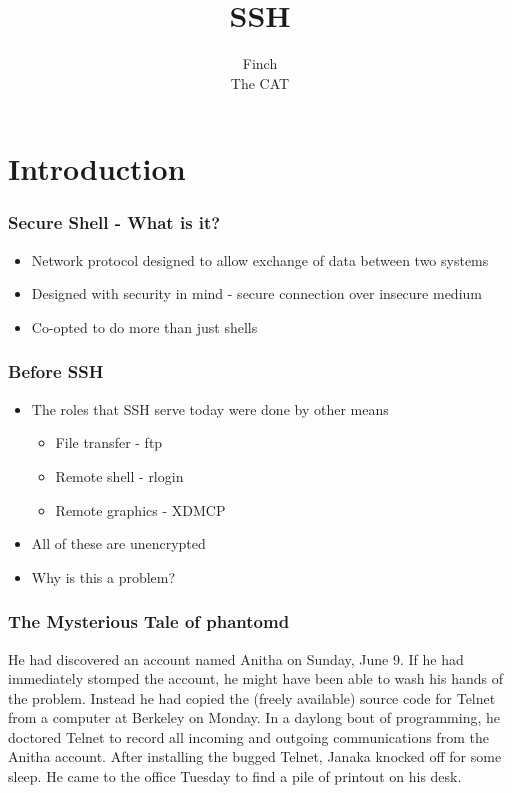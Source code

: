 \documentclass{beamer}
\title{SSH}
\author{
Finch \\
The CAT
}
\begin{document}
\begin{frame}
  \titlepage
\end{frame}

\section{Introduction}

\begin{frame}
  \frametitle{Secure Shell - What is it?}
  \begin{itemize}
    \item Network protocol designed to allow exchange of data between two systems
    \item Designed with security in mind - secure connection over insecure medium
    \item Co-opted to do more than just shells
  \end{itemize}
\end{frame}

\begin{frame}
  \frametitle{Before SSH}
  \begin{itemize}
    \item The roles that SSH serve today were done by other means
    \begin{itemize}
      \item File transfer - ftp
      \item Remote shell - rlogin
      \item Remote graphics - XDMCP
    \end{itemize}
    \item All of these are unencrypted
    \pause
    \item Why is this a problem?
  \end{itemize}
\end{frame}

\begin{frame}
  \frametitle{The Mysterious Tale of phantomd}
He had discovered an account named Anitha on Sunday, June 9. If he had
immediately stomped the account, he might have been able to wash his hands of
the problem. Instead he had copied the (freely available) source code for
Telnet from a computer at Berkeley on Monday. In a daylong bout of programming,
he doctored Telnet to record all incoming and outgoing communications from the
Anitha account. After installing the bugged Telnet, Janaka knocked off for some
sleep. He came to the office Tuesday to find a pile of printout on his desk.
\end{frame}
\end{document}
